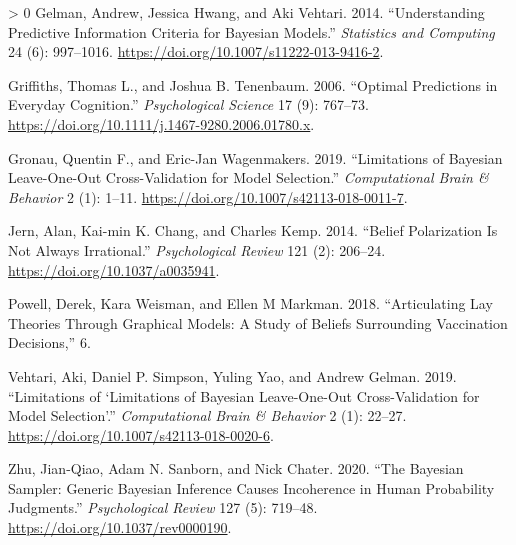 \documentclass{article}
\newlength{\cslhangindent}
\newenvironment{CSLReferences}[3] %
 {%
  \setlength{\parindent}{0pt}
  \ifodd #1 \everypar{\setlength{\hangindent}{\cslhangindent}}\ignorespaces\fi
  \ifnum #2 > 0
  \setlength{\parskip}{#2\baselineskip}
  \fi
 }%
 {}
\begin{document}
\begin{CSLReferences}{1}{0}
\leavevmode\hypertarget{ref-gelman.etal2014}{}%
Gelman, Andrew, Jessica Hwang, and Aki Vehtari. 2014. {``Understanding
Predictive Information Criteria for {Bayesian} Models.''}
\emph{Statistics and Computing} 24 (6): 997--1016.
\url{https://doi.org/10.1007/s11222-013-9416-2}.

\leavevmode\hypertarget{ref-griffiths.tenenbaum2006}{}%
Griffiths, Thomas L., and Joshua B. Tenenbaum. 2006. {``Optimal
{Predictions} in {Everyday Cognition}.''} \emph{Psychological Science}
17 (9): 767--73. \url{https://doi.org/10.1111/j.1467-9280.2006.01780.x}.

\leavevmode\hypertarget{ref-gronau.wagenmakers2019}{}%
Gronau, Quentin F., and Eric-Jan Wagenmakers. 2019. {``Limitations of
{Bayesian Leave}-{One}-{Out Cross}-{Validation} for {Model
Selection}.''} \emph{Computational Brain \& Behavior} 2 (1): 1--11.
\url{https://doi.org/10.1007/s42113-018-0011-7}.

\leavevmode\hypertarget{ref-jern.etal2014}{}%
Jern, Alan, Kai-min K. Chang, and Charles Kemp. 2014. {``Belief
Polarization Is Not Always Irrational.''} \emph{Psychological Review}
121 (2): 206--24. \url{https://doi.org/10.1037/a0035941}.

\leavevmode\hypertarget{ref-powell.etal2018}{}%
Powell, Derek, Kara Weisman, and Ellen M Markman. 2018. {``Articulating
Lay Theories Through Graphical Models: {A} Study of Beliefs Surrounding
Vaccination Decisions,''} 6.

\leavevmode\hypertarget{ref-vehtari.etal2019}{}%
Vehtari, Aki, Daniel P. Simpson, Yuling Yao, and Andrew Gelman. 2019.
{``Limitations of {`{Limitations} of {Bayesian Leave}-One-Out
{Cross}-{Validation} for {Model Selection}'}.''} \emph{Computational
Brain \& Behavior} 2 (1): 22--27.
\url{https://doi.org/10.1007/s42113-018-0020-6}.

\leavevmode\hypertarget{ref-zhu.etal2020}{}%
Zhu, Jian-Qiao, Adam N. Sanborn, and Nick Chater. 2020. {``The
{Bayesian} Sampler: {Generic Bayesian} Inference Causes Incoherence in
Human Probability Judgments.''} \emph{Psychological Review} 127 (5):
719--48. \url{https://doi.org/10.1037/rev0000190}.

\end{CSLReferences}



\end{document}
